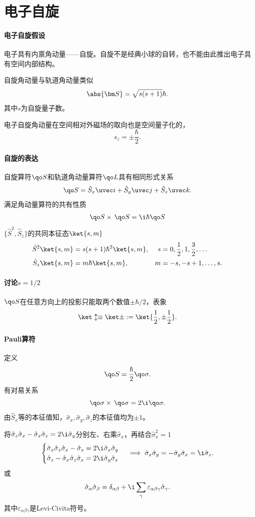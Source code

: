 \section{电子自旋}
\paragraph{电子自旋假设}
\begin{compactenum}
	\item 电子具有内禀角动量——自旋。自旋不是经典小球的自转，也不能由此推出电子具有空间内部结构。%
	\item 自旋角动量与轨道角动量类似
		\[
		\abs{\bm S}=\sqrt{s(s+1)}\hbar.
\]
		其中$s$为自旋量子数。
	\item 电子自旋角动量在空间相对外磁场的取向也是空间量子化的，
		\[
s_z=\pm\frac{\hbar}2.
\]
\end{compactenum}
\paragraph{自旋的表达}自旋算符$\qo S$和轨道角动量算符$\qo L$具有相同形式关系
\[
	\qo S=\hat S_x\uvec i+\hat S_y\uvec j+\hat S_z\uvec k.
\]
满足角动量算符的共有性质
\begin{gather}
	\qo S\times\,\qo S=\i\hbar\qo S %
\end{gather}
$\{\hat S^2,\hat S_z\}$的共同本征态$\ket{s,m}$
\begin{align}
	\hat S^2\ket{s,m}&=s(s+1)\hbar^2\ket{s,m},&s&=0,\frac12,1,\frac32,\ldots\\
	\hat S_z\ket{s,m}&=m\hbar\ket{s,m},&m&=-s,-s+1,\ldots,s.
\end{align}
\paragraph{讨论$s=1/2$}$\qo S$在任意方向上的投影只能取两个数值$\pm\hbar/2$，表象 
\[
	\ket\updownarrow\equiv\ket\pm:=\ket{\frac12,\pm\frac12}.
\]
\paragraph{Pauli算符}定义 
\[
	\qo S=\frac\hbar{2}\qo\sigma.
\]
有对易关系
\[
	\qo\sigma\times\,\qo\sigma=2\i\qo\sigma.
\]
由$\hat S_x$等的本征值知，$\hat\sigma_x,\hat\sigma_y,\hat\sigma_z$的本征值均为$\pm 1$。

将$\hat\sigma_z\hat\sigma_x-\hat\sigma_x\hat\sigma_z=2\i\hat\sigma_y$分别左、右乘$\hat\sigma_x$，再结合$\hat\sigma_x^2=1$
\begin{align}
	\begin{cases}
		\hat\sigma_x\hat\sigma_z\hat\sigma_x-\hat\sigma_z=2\i\hat\sigma_x\hat\sigma_y\\
		\hat\sigma_z-\hat\sigma_x\hat\sigma_z\hat\sigma_x=2\i\hat\sigma_y\hat\sigma_x
	\end{cases}\implies\hat\sigma_x\hat\sigma_y=-\hat\sigma_y\hat\sigma_x=\i\hat\sigma_z.
\end{align}
或
\begin{align}
	\hat\sigma_\alpha\hat\sigma_\beta=\delta_{\alpha\beta}+\i\sum_\gamma\varepsilon_{\alpha\beta\gamma}\hat\sigma_\gamma.
\end{align}
其中$\varepsilon_{\alpha\beta\gamma}$是Levi-Civita符号。

